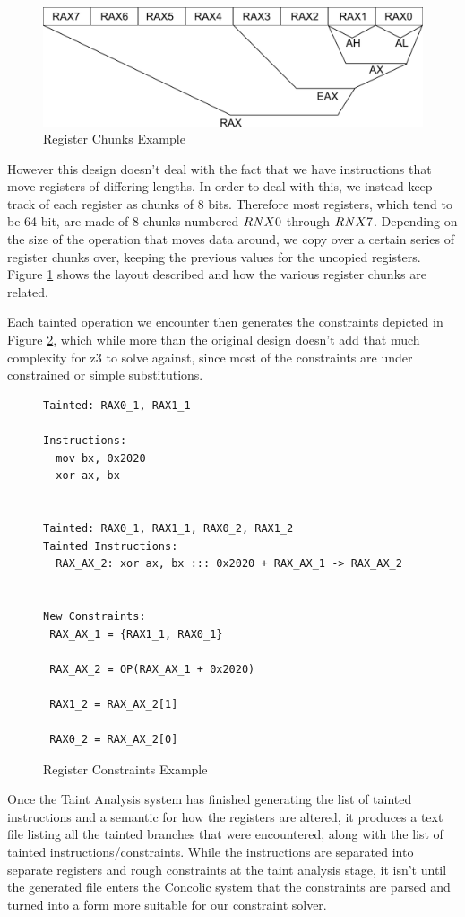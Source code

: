 \begin{figure}[ht]
 \centering
 \includegraphics{taintregs}
 \caption{Register Chunks Example}
 \label{figure:taintregs}
\end{figure}

However this design doesn't deal with the fact that we have instructions that
move registers of differing lengths. In order to deal with this, we instead keep
track of each register as chunks of 8 bits. Therefore most registers, which tend
to be 64-bit, are made of 8 chunks numbered $R{\it N}X0$ through $R{\it  N}X7$.  
Depending on the size of the operation that moves data around, we copy
over a certain series of register chunks over, keeping the previous values for
the uncopied registers. Figure \ref{figure:taintregs} shows the layout described
and how the various register chunks are related.

Each tainted operation we encounter then generates the constraints depicted in
Figure \ref{figure:regexample}, which while more than the original design
doesn't add that much complexity for z3 to solve against, since most of the
constraints are under constrained or simple substitutions.

\begin{figure}[t]
\centering
\begin{verbatim}
Tainted: RAX0_1, RAX1_1

Instructions:
  mov bx, 0x2020
  xor ax, bx


Tainted: RAX0_1, RAX1_1, RAX0_2, RAX1_2
Tainted Instructions:
  RAX_AX_2: xor ax, bx ::: 0x2020 + RAX_AX_1 -> RAX_AX_2


New Constraints:
 RAX_AX_1 = {RAX1_1, RAX0_1}

 RAX_AX_2 = OP(RAX_AX_1 + 0x2020)

 RAX1_2 = RAX_AX_2[1]

 RAX0_2 = RAX_AX_2[0]
\end{verbatim}
\caption{Register Constraints Example}
\label{figure:regexample}
\end{figure}

Once the Taint Analysis system has finished generating the list of tainted
instructions and a semantic for how the registers are altered, it produces a
text file listing all the tainted branches that were encountered, along with the
list of tainted instructions/constraints. While the instructions are separated
into separate registers and rough constraints at the taint analysis stage, it
isn't until the generated file enters the Concolic system that the constraints
are parsed and turned into a form more suitable for our constraint solver.

